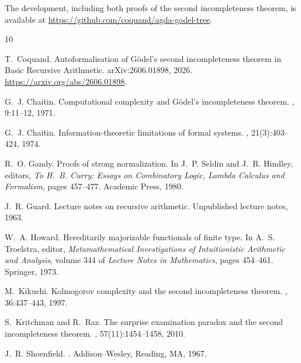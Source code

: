 \documentclass[11pt]{article}
\theoremstyle{plain}
\theoremstyle{definition}
\theoremstyle{remark}
\begin{document}
The development, including both proofs of the second incompleteness
theorem, is available at
\url{https://github.com/coquand/agda-godel-tree}.

\begin{thebibliography}{10}

T.~Coquand.
\newblock Autoformalisation of G\"odel's second incompleteness theorem in
  Basic Recursive Arithmetic.
\newblock arXiv:2606.01898, 2026.
\newblock \url{https://arxiv.org/abs/2606.01898}.

G.~J. Chaitin.
\newblock Computational complexity and G\"odel's incompleteness theorem.
, 9:11--12, 1971.

G.~J. Chaitin.
\newblock Information-theoretic limitations of formal systems.
, 21(3):403--424, 1974.

R.~O. Gandy.
\newblock Proofs of strong normalization.
\newblock In J.~P. Seldin and J.~R. Hindley, editors, {\em To H.~B. Curry:
  Essays on Combinatory Logic, Lambda Calculus and Formalism}, pages
  457--477. Academic Press, 1980.

J.~R. Guard.
\newblock Lecture notes on recursive arithmetic.
\newblock Unpublished lecture notes, 1963.

W.~A. Howard.
\newblock Hereditarily majorizable functionals of finite type.
\newblock In A.~S. Troelstra, editor, {\em Metamathematical Investigations of
  Intuitionistic Arithmetic and Analysis}, volume 344 of {\em Lecture Notes in
  Mathematics}, pages 454--461. Springer, 1973.

M.~Kikuchi.
\newblock Kolmogorov complexity and the second incompleteness theorem.
, 36:437--443, 1997.

S.~Kritchman and R.~Raz.
\newblock The surprise examination paradox and the second incompleteness
  theorem.
, 57(11):1454--1458,
  2010.

J.~R. Shoenfield.
.
\newblock Addison--Wesley, Reading, MA, 1967.

\end{thebibliography}
\end{document}
